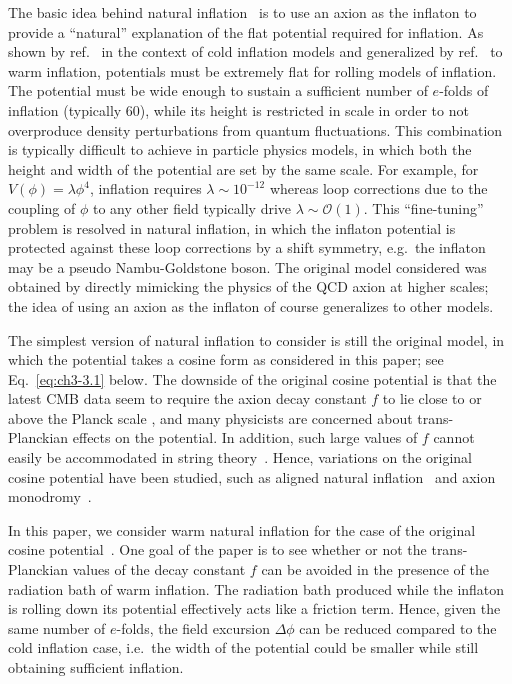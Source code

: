 The basic idea behind natural inflation~\cite{Freese:1990rb} is to use an axion as the inflaton to provide a ``natural'' explanation of the flat potential required for inflation. As shown by ref.~\cite{Adams:1990pn} in the context of cold inflation models and generalized by ref.~\cite{Montefalcone:2022owy} to warm inflation, potentials must be extremely flat for rolling models of inflation. The potential must be wide enough to sustain a sufficient number of $e$-folds of inflation (typically 60), while its height is restricted in scale in order to not overproduce density perturbations from quantum fluctuations. This combination is typically difficult to achieve in particle physics models, in which both the height and width of the potential are set by the same scale. For example, for $V(\phi) = \lambda \phi^4$, inflation requires $\lambda \sim 10^{-12}$ whereas loop corrections due to the coupling of $\phi$ to any other field typically drive $\lambda \sim \mathcal{O}(1)$. This ``fine-tuning'' problem is resolved in natural inflation, in which the inflaton potential is protected against these loop corrections by a shift symmetry, e.g.\ the inflaton may be a pseudo Nambu-Goldstone boson. The original model considered was obtained by directly mimicking the physics of the QCD axion at higher scales; the idea of using an axion as the inflaton of course generalizes to other models.

The simplest version of natural inflation to consider is still the original model, in which the potential takes a cosine form as considered in this paper; see Eq.~\ref{eq:ch3-3.1} below. The downside of the original cosine potential is that the latest CMB data seem to require the axion decay constant $f$ to lie close to or above the Planck scale \cite{Freese:2014nla,Stein:2021uge}, and many physicists are concerned about trans-Planckian effects on the potential. In addition, such large values of $f$ cannot easily be accommodated in string theory~\cite{Banks:2003sx}. Hence, variations on the original cosine potential have been studied, such as aligned natural inflation~\cite{Kim:2004rp} and axion monodromy~\cite{Silverstein:2008sg}.

In this paper, we consider warm natural inflation for the case of the original cosine potential~\cite{Mishra:2011vh, Visinelli:2011jy}. One goal of the paper is to see whether or not the trans-Planckian values of the decay constant $f$ can be avoided in the presence of the radiation bath of warm inflation. The radiation bath produced while the inflaton is rolling down its potential effectively acts like a friction term. Hence, given the same number of $e$-folds,
the field excursion $\Delta \phi$ can be reduced compared to the cold inflation case,
i.e.\ the width of the potential could be smaller while still obtaining sufficient inflation.

